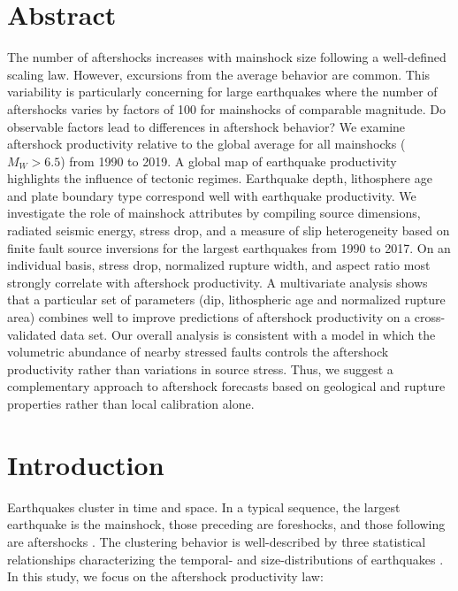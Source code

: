 \documentclass[draft, jgrga]{agujournal2018}
\begin{document}
\justify

\section*{Abstract}

The number of aftershocks increases with mainshock size following a well-defined scaling law. However, excursions from the average behavior are common. This variability is particularly concerning for large earthquakes where the number of aftershocks varies by factors of 100 for mainshocks of comparable magnitude. Do observable factors lead to differences in aftershock behavior? We examine aftershock productivity relative to the global average for all mainshocks ($M_W>6.5$) from 1990 to 2019. A global map of earthquake productivity highlights the influence of tectonic regimes. Earthquake depth, lithosphere age and plate boundary type correspond well with earthquake productivity. We investigate the role of mainshock attributes by compiling source dimensions, radiated seismic energy, stress drop, and a measure of slip heterogeneity based on finite fault source inversions for the largest earthquakes from 1990 to 2017. On an individual basis, stress drop, normalized rupture width, and aspect ratio most strongly correlate with aftershock productivity. A multivariate analysis shows that a particular set of parameters (dip, lithospheric age and normalized rupture area) combines well to improve predictions of aftershock productivity on a cross-validated data set. Our overall analysis is consistent with a model in which the volumetric abundance of nearby stressed faults controls the aftershock productivity rather than variations in source stress. Thus, we suggest a complementary approach to aftershock forecasts based on geological and rupture properties rather than local calibration alone.  

\section{Introduction}

Earthquakes cluster in time and space. In a typical sequence, the largest earthquake is the mainshock, those preceding are foreshocks, and those following are aftershocks \citep{Omori1895}. The clustering behavior is well-described by three statistical relationships characterizing the temporal- and size-distributions of earthquakes \citep[e.g.,][]{Ogata1988}. In this study, we focus on the aftershock productivity law:
\end{document}

